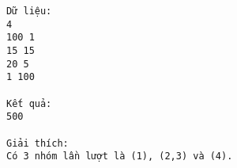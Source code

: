 \begin{verbatim}
Dữ liệu:
4
100 1
15 15
20 5
1 100

Kết quả:
500

Giải thích: 
Có 3 nhóm lần lượt là (1), (2,3) và (4). 

\end{verbatim}